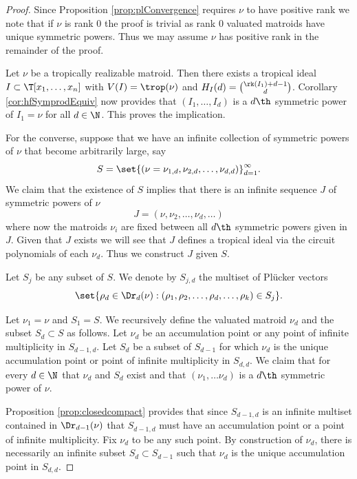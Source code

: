 \begin{proof}
Since Proposition \ref{prop:plConvergence} requires $\nu$ to have positive rank we note that if $\nu$ is rank $0$ the proof is trivial as rank $0$ valuated matroids have unique symmetric powers. Thus we may assume $\nu$ has positive rank in the remainder of the proof.

Let $\nu$ be a tropically realizable matroid. Then there exists a tropical ideal $I\subset \T[x_1,\dots, x_n]$ with $V(I)=\trop(\nu)$ and $H_I(d)=\binom{\rk(I_1)+d-1}{d}$. Corollary \ref{cor:hfSymprodEquiv} now provides that $(I_1,\dots,I_d)$ is a $d\th$ symmetric power of $I_1=\nu$ for all $d\in \N$. This proves the implication.

For the converse, suppose that we have an infinite collection of symmetric powers of $\nu$ that become arbitrarily large, say 
$$S = \set{(\nu=\nu_{1,d},\nu_{2,d},\dots, \nu_{d,d})}_{d=1}^\infty.$$
We claim that the existence of $S$ implies that there is an infinite sequence $J$ of symmetric powers of $\nu$
$$J = (\nu, \nu_2, \dots, \nu_d, \dots)$$
where now the matroids $\nu_i$ are fixed between all $d\th$ symmetric powers given in $J$. Given that $J$ exists we will see that $J$ defines a tropical ideal via the circuit polynomials of each $\nu_d$. Thus we construct $J$ given $S$.

Let $S_j$ be any subset of $S$. We denote by $S_{j,d}$ the multiset of Pl\"ucker vectors
$$\set{\rho_d\in \Dr_d(\nu): (\rho_1,\rho_2,\dots, \rho_d,\dots, \rho_k)\in S_j}.$$

Let $\nu_1 = \nu$ and $S_1=S$. We recursively define the valuated matroid $\nu_d$ and the subset $S_d\subset S$ as follows. Let $\nu_d$ be an accumulation point or any point of infinite multiplicity in $S_{d-1,d}$. Let $S_d$ be a subset of $S_{d-1}$ for which $\nu_d$ is the unique accumulation point or point of infinite multiplicity in $S_{d,d}$. We claim that for every $d\in \N$ that $\nu_d$ and $S_d$ exist and that $(\nu_1,\dots \nu_d)$ is a $d\th$ symmetric power of $\nu$.

Proposition \ref{prop:closedcompact} provides that since $S_{d-1,d}$ is an infinite multiset contained in $\Dr_{d-1}(\nu)$ that $S_{d-1,d}$ must have an accumulation point or a point of infinite multiplicity. Fix $\nu_d$ to be any such point. By construction of $\nu_d$, there is necessarily an infinite subset $S_d\subset S_{d-1}$ such that $\nu_d$ is the unique accumulation point in $S_{d,d}$. 


\end{proof}

